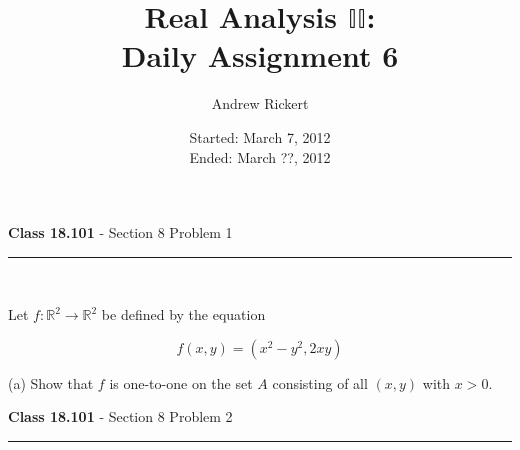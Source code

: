 \documentclass[11pt,reqno]{article}
\title{Real Analysis $\mathbb{II}$: \\ Daily Assignment 6}
\author{Andrew Rickert}
\date{Started: March 7, 2012 \\ \hspace{1pt} Ended: March ??,  2012}                                           %
\begin{document}
\maketitle

\begin{flushleft} 
\textbf{Class 18.101} - Section 8 Problem 1\\
\rule{500pt}{1pt}\\
\end{flushleft} 

\noindent Let $f : \mathbb{R}^2 \to \mathbb{R}^2$ be defined by the equation

\[ f(x,y) = (x^2 - y^2, 2 x y) \]

\noindent (a) Show that $f$ is one-to-one on the set $A$ consisting of all $(x,y)$ with $x > 0$. \\

\begin{flushleft} 
\textbf{Class 18.101} - Section 8 Problem 2\\
\rule{500pt}{1pt}\\
\end{flushleft} 
\end{document}
